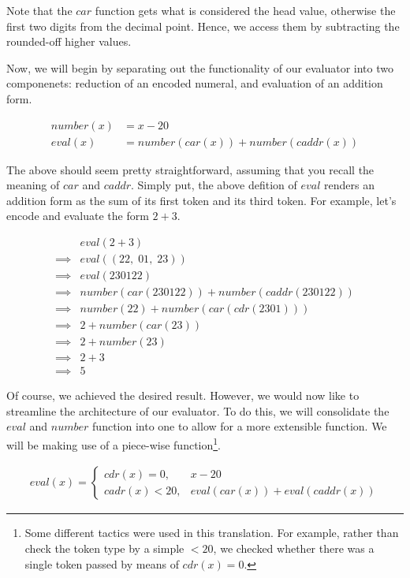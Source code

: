 \documentclass{article}
\begin{document}
Note that the $car$ function gets what is considered the head value, otherwise the first two digits from
the decimal point. Hence, we access them by subtracting the rounded-off higher values.

Now, we will begin by separating out the functionality of our evaluator into two componenets: reduction
of an encoded numeral, and evaluation of an addition form.

\begin{align*}
    number(x) &= x - 20
\\  eval(x) &= number(car(x)) + number(caddr(x))
\end{align*}

The above should seem pretty straightforward, assuming that you recall the meaning of $car$ and $caddr$.
Simply put, the above defition of $eval$ renders an addition form as the sum of its first token and
its third token. For example, let's encode and evaluate the form $2 + 3$.

\begin{align*}
    &eval(2 + 3)
\\  \implies &eval((22, \; 01, \; 23))
\\  \implies &eval(230122)
\\  \implies &number(car(230122)) + number(caddr(230122))
\\  \implies &number(22) + number(car(cdr(2301)))
\\  \implies &2 + number(car(23))
\\  \implies &2 + number(23)
\\  \implies &2 + 3
\\  \implies &5
\end{align*}

Of course, we achieved the desired result. However, we would now like to streamline the architecture of
our evaluator. To do this, we will consolidate the $eval$ and $number$ function into one to allow for
a more extensible function. We will be making use of a piece-wise function\footnote{Some different 
tactics were used in this translation. For example, rather than check the token type by a simple $< 20$, 
we checked whether there was a single token passed by means of $cdr(x) = 0$.}.

\begin{align*}
eval(x) = \left\{
  \begin{array}{lr}
       cdr(x) = 0, &x - 20
    \\ cadr(x) < 20, &eval(car(x)) + eval(caddr(x))
  \end{array}
\right.
\end{align*}
\end{document}
